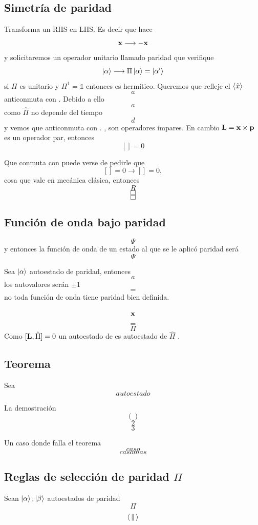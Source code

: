 \documentclass[10pt,oneside]{CBFT_book}
\begin{document}
\subsection{Simetría de paridad}

Transforma un RHS en LHS. Es decir que hace 
\[
	\vb{x} \longrightarrow - \vb{x}
\]
y solicitaremos un operador unitario llamado paridad que verifique 
\[
	\Ket{\alpha} \longrightarrow \Pi\Ket{\alpha} = \Ket{\alpha'}
\]
si $\Pi$ es unitario y $\Pi^1=\mathbb{1}$ entonces es hermítico.
Queremos que refleje el $\Braket{\hat{x}}$ 
\[
	a
\]
anticonmuta con .
Debido a ello 
\[
	a
\]
como $\hat{\Pi}$ no depende del tiempo 
\[
	d
\]
y vemos que anticonmuta con .
,  son operadores impares. En cambio $\vb{L}=\vb{x}\times\vb{p}$ es un operador par, entonces 
\[
	[] = 0
\]

Que conmuta con  puede verse de pedirle que 
\[
	[] = 0 \longrightarrow [] = 0 ,
\]
cosa que vale en mecánica clásica, entonces 
\[
	R
\]
\[
	\Box
\]
\[
	\Box
\]

\subsection{Función de onda bajo paridad}

\[
	\Psi
\]
y entonces la función de onda de un estado al que se le aplicó paridad será 
\[
	\Psi
\]

Sea $\Ket{\alpha}$ autoestado de paridad, entonces 
\[
	a
\]
los autovalores serán $\pm 1$
\[
	=
\]
no toda función de onda tiene paridad bien definida.

\[
	\vb{x}
\]
\[
	=
\]
\[
	\Pi
\]
Como $[\vb{L},\hat{\Pi}]=0$ un autoestado de  es autoestado de $\hat{\Pi}$ .

\subsection{Teorema}

Sea 
\[
	autoestado 
\]

La demostración 
\[
	()
\]
\[
	2
\]
\[
	3
\]

Un caso donde falla el teorema 
\[
	caso
\]
\[
	caso mas
\]

\subsection{Reglas de selección de paridad $\Pi$}

Sean $\Ket{\alpha}, \Ket{\beta}$ autoestados de paridad 
\[
	\Pi
\]
\[
	\Braket{||}
\]
\end{document}
